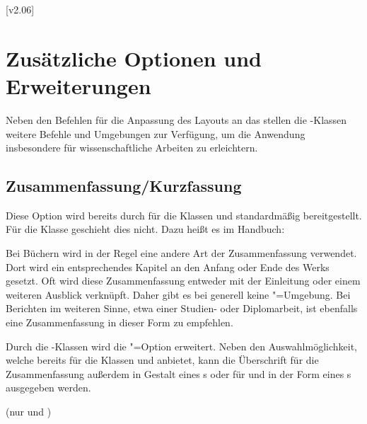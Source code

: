 \begin{Declaration*}{}
\begin{Declaration*}{}
\begin{Declaration*}{}
[v2.06]
\clearpage
\section{Zusätzliche Optionen und Erweiterungen}
%
Neben den Befehlen für die Anpassung des Layouts an das \TUDCD stellen die 
\TUDScript-Klassen weitere Befehle und Umgebungen zur Verfügung, um die 
Anwendung insbesondere für wissenschaftliche Arbeiten zu erleichtern.


\subsection{Zusammenfassung/Kurzfassung}
%
%
\begin{Declaration}[%
  v2.02!\Option{abstract=multiple}:ersetzt \Option{abstract=double};%
  v2.02!\Option{abstract=tocleveldown};%
  v2.02!\Option{abstract=markboth};%
  v2.04!\Option{abstract=tocmultiple}%
]{}%
\printdeclarationlist%
%
%
Diese Option wird bereits durch \KOMAScript{} für die Klassen  
und  standardmäßig bereitgestellt. Für die Klasse 
 geschieht dies nicht. Dazu heißt es im Handbuch:
%
\begin{quoting}
Bei Büchern wird in der Regel eine andere Art der Zusammenfassung verwendet. 
Dort wird ein entsprechendes Kapitel an den Anfang oder Ende des Werks gesetzt. 
Oft wird diese Zusammenfassung entweder mit der Einleitung oder einem weiteren 
Ausblick verknüpft. Daher gibt es bei  generell keine 
"=Umgebung. Bei Berichten im weiteren Sinne, etwa einer 
Studien- oder Diplomarbeit, ist ebenfalls eine Zusammenfassung in dieser Form 
zu empfehlen.
\end{quoting}
%
Durch die \TUDScript-Klassen wird die "=Option erweitert. 
Neben den Auswahlmöglichkeit, welche bereits \KOMAScript{} für die Klassen 
 und  anbietet, kann die Überschrift für 
die Zusammenfassung außerdem in Gestalt eines \sectionautorefname{}s oder für 
 und  in der Form eines 
\chapterautorefname{}s ausgegeben werden.
%
\begin{values}{}
\itemfalse(nur  und )

\end{values}
\end{Declaration}
\end{Declaration*}
\end{Declaration*}
\end{Declaration*}
